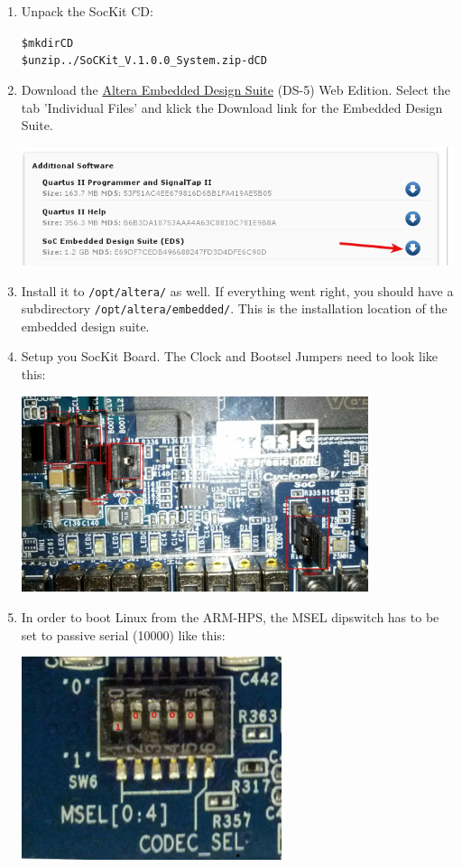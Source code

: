 \documentclass[twoside]{article}
\begin{document}
\begin{enumerate}
\item Unpack the SocKit CD:
  \begin{alltt}
\$ mkdir CD
\$ unzip ../SoCKit\_V.1.0.0\_System.zip -d CD
  \end{alltt}

\item Download the
  \href{http://dl.altera.com/?edition=web#tabs-2}{Altera Embedded
    Design Suite} (DS-5) Web Edition. Select the tab 'Individual
  Files' and klick the Download link for the Embedded Design Suite.

\includegraphics[width=\textwidth]{download-eds.png}

\item Install it to \texttt{/opt/altera/} as well. If everything went
  right, you should have a subdirectory
  \texttt{/opt/altera/embedded/}. This is the installation location of
  the embedded design suite.

\item Setup you SocKit Board. The Clock and Bootsel Jumpers need to
  look like this:

\includegraphics[width=0.8\textwidth]{boardjumpers.jpeg}

\item In order to boot Linux from the ARM-HPS, the MSEL dipswitch has
  to be set to passive serial (10000) like this:

\includegraphics[width=0.6\textwidth]{dipswitch.jpeg}


\end{enumerate}
\end{document}
